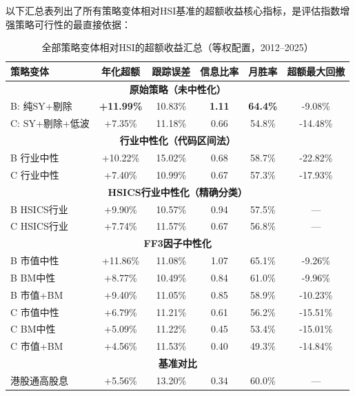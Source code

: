 \documentclass[10pt,a4paper]{ctexart}
\begin{document}
以下汇总表列出了所有策略变体相对HSI基准的超额收益核心指标，是评估指数增强策略可行性的最直接依据：

\begin{table}[htbp]
\centering
\caption{全部策略变体相对HSI的超额收益汇总（等权配置，2012--2025）}
\begin{tabular}{lccccc}
\toprule
\textbf{策略变体} & \textbf{年化超额} & \textbf{跟踪误差} & \textbf{信息比率} & \textbf{月胜率} & \textbf{超额最大回撤} \\
\midrule
\multicolumn{6}{c}{\textbf{原始策略（未中性化）}} \\
\midrule
B: 纯SY+剔除 & \textbf{+11.99\%} & 10.83\% & \textbf{1.11} & \textbf{64.4\%} & -9.08\% \\
C: SY+剔除+低波 & +7.35\% & 11.18\% & 0.66 & 54.8\% & -14.48\% \\
\midrule
\multicolumn{6}{c}{\textbf{行业中性化（代码区间法）}} \\
\midrule
B 行业中性 & +10.22\% & 15.02\% & 0.68 & 58.7\% & -22.82\% \\
C 行业中性 & +7.40\% & 10.99\% & 0.67 & 57.3\% & -17.93\% \\
\midrule
\multicolumn{6}{c}{\textbf{HSICS行业中性化（精确分类）}} \\
\midrule
B HSICS行业 & +9.90\% & 10.57\% & 0.94 & 57.5\% & --- \\
C HSICS行业 & +7.74\% & 11.57\% & 0.67 & 56.8\% & --- \\
\midrule
\multicolumn{6}{c}{\textbf{FF3因子中性化}} \\
\midrule
B 市值中性 & +11.86\% & 11.08\% & 1.07 & 65.1\% & -9.26\% \\
B BM中性 & +8.77\% & 10.49\% & 0.84 & 61.0\% & -9.96\% \\
B 市值+BM & +9.40\% & 11.05\% & 0.85 & 58.9\% & -10.23\% \\
C 市值中性 & +6.79\% & 11.21\% & 0.61 & 56.2\% & -15.51\% \\
C BM中性 & +5.09\% & 11.22\% & 0.45 & 53.4\% & -15.01\% \\
C 市值+BM & +4.56\% & 11.53\% & 0.40 & 49.3\% & -14.84\% \\
\midrule
\multicolumn{6}{c}{\textbf{基准对比}} \\
\midrule
港股通高股息 & +5.56\% & 13.20\% & 0.34 & 60.0\% & --- \\
\bottomrule
\end{tabular}
\end{table}
\end{document}
